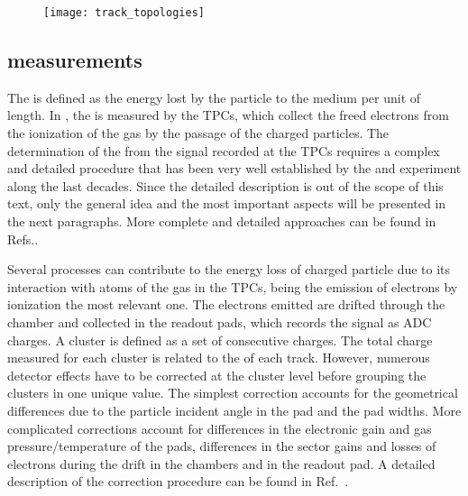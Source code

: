 \begin{figure}[!ht]
  \centering
  \texttt{[image: track\_topologies]}
  \caption{ \cite{MartinThesis}}
  \label{fig:hadron:track:topologies}
\end{figure}


\subsection{\dedx measurements}
\label{sec:hadron:dedx:meas}


The \dedx is defined as the energy lost by the
particle to the medium per unit of length. 
In \NASixtyOne, the \dedx is measured by the TPCs, which collect the 
freed electrons from the ionization of the gas by the passage of the charged particles.
The determination of the \dedx from the signal recorded at the TPCs requires a complex and
detailed procedure that has been very well established by the \NAFortyNine and \NASixtyOne
experiment along the last decades. Since the detailed description 
is out of the scope of this text, only the general idea and the most important aspects
will be presented in the next paragraphs. More complete and detailed approaches
can be found in Refs.\cite{BlumBook,LeeuwenThesis,GaborVeresThesis}.

Several processes can contribute to the energy loss of charged particle due to
its interaction with atoms of the gas in the TPCs, being the emission of
electrons by ionization the most relevant one. The electrons emitted are
drifted through the chamber and collected in the readout pads, which records
the signal as ADC charges. A cluster is defined as a set of consecutive charges.
The total charge measured for each cluster is related to the \dedx of each track.
However, numerous detector effects have to be corrected at the cluster level before
grouping the clusters in one unique \dedx value. The simplest correction accounts for
the geometrical differences due to the particle incident angle in the pad and
the pad widths. More complicated corrections account for differences in the electronic
gain and gas pressure/temperature of the pads, differences in the sector gains and
losses of electrons during the drift in the chambers and in the readout pad.
A detailed description of the correction procedure can be found in Ref.~\cite{AntoniMThesis}.

